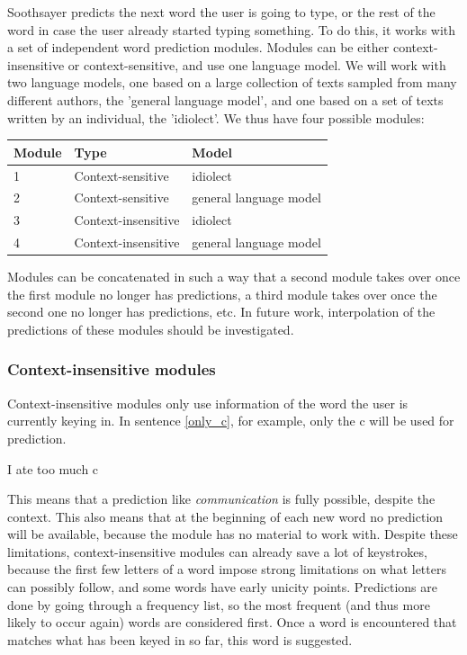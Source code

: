 \documentclass[12pt]{article}
\let\originaltable\table
\let\endoriginaltable\endtable
\renewenvironment{table}[1][ht]{%
  \originaltable[#1]
  \centering}%
  {\endoriginaltable}
\begin{document}
Soothsayer predicts the next word the user is going to type, or the rest of the word in case the user already started typing something. To do this, it works with a set of independent word prediction modules. Modules can be either context-insensitive or context-sensitive, and use one language model. We will work with two language models, one based on a large collection of texts sampled from many different authors, the 'general language model', and one based on a set of texts written by an individual, the 'idiolect'. We thus have four possible modules:

\begin{table}[htb]
\begin{tabular}{lll} 
Module&Type&Model\\
\hline
1& {\footnotesize Context-sensitive} & {\footnotesize idiolect}\\
2& {\footnotesize Context-sensitive} & {\footnotesize general language model} \\
3& {\footnotesize Context-insensitive} & {\footnotesize idiolect}\\ 
4& {\footnotesize Context-insensitive} & {\footnotesize general language model} \\
\end{tabular} 
\caption{Four possible modules: combinations of type and language model}
\end{table}

Modules can be concatenated in such a way that a second module takes over once the first module no longer has predictions, a third module takes over once the second one no longer has predictions, etc. In future work, interpolation of the predictions of these modules should be investigated.

\subsubsection{Context-insensitive modules} \label{ci}

Context-insensitive modules only use information of the word the user is currently keying in. In sentence \ref{only_c}, for example, only the c will be used for prediction. 

\begin{examples}
\item I ate too much c \label{only_c}
\end{examples}

This means that a prediction like \emph{communication} is fully possible, despite the context. This also means that at the beginning of each new word no prediction will be available, because the module has no material to work with. Despite these limitations, context-insensitive modules can already save a lot of keystrokes, because the first few letters of a word impose strong limitations on what letters can possibly follow, and some words have early unicity points. Predictions are done by going through a frequency list, so the most frequent (and thus more likely to occur again) words are considered first. Once a word is encountered that matches what has been keyed in so far, this word is suggested.
\end{document}
